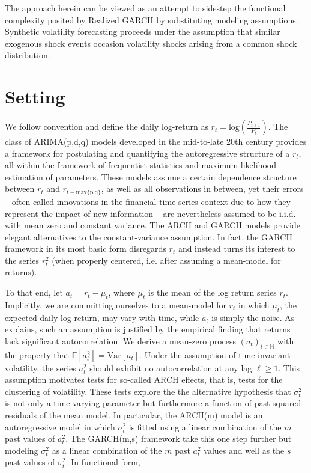 \documentclass[11pt]{article}
\def\mrm#1{\mathrm{#1}} %
\def\E{\mathbb{E}} %
\theoremstyle{definition}
\begin{document}
The approach herein can be viewed as an attempt to sidestep the functional complexity posited by Realized GARCH by substituting modeling assumptions.  Synthetic volatility forecasting proceeds under the assumption that similar exogenous shock events occasion volatility shocks arising from a common shock distribution.


\section{Setting}

\label{section2}

We follow convention and define the daily log-return as $r_{t} = \text{log}(\frac{P_{t+1}}{P_{t}})$.  The class of ARIMA(p,d,q) models developed in the mid-to-late 20th century provides a framework for postulating and quantifying the autoregressive structure of a $r_{t}$, all within the framework of frequentist statistics and maximum-likelihood estimation of parameters.  These models assume a certain dependence structure between $r_{t}$ and $r_{t-\text{max\{p,q\}}}$, as well as all observations in between, yet their errors -- often called innovations in the financial time series context due to how they represent the impact of new information -- are nevertheless assumed to be i.i.d. with mean zero and constant variance.  The ARCH \citep{engle1982autoregressive} and GARCH \citep{bollerslev1986generalized} models provide elegant alternatives to the constant-variance assumption.  In fact, the GARCH framework in its most basic form disregards $r_{t}$ and instead turns its interest to the series $r_{t}^{2}$ (when properly centered, i.e. after assuming a mean-model for returns).  

To that end, let $a_{t} = r_{t} - \mu_{t}$, where $\mu_{t}$ is the mean of the log return series $r_{t}$.  Implicitly, we are committing ourselves to a mean-model for $r_{t}$ in which $\mu_{t}$, the expected daily log-return, may vary with time, while $a_{t}$ is simply the noise.  As \citet{cont2001empirical} explains, such an assumption is justified by the empirical finding that returns lack significant autocorrelation.  We derive a mean-zero process $(a_{t})_{t\in\mathbb{N}}$ with the property that $\E[a^{2}_{t}] = \mrm{Var}[a_{t}]$.  Under the assumption of time-invariant volatility, the series $a_{t}^{2}$ should exhibit no autocorrelation at any lag $\ell\geq1$.  This assumption motivates tests for so-called ARCH effects, that is, tests for the clustering of volatility.  These tests explore the the alternative hypothesis that $\sigma_{t}^{2}$ is not only a time-varying parameter but furthermore a function of past squared residuals of the mean model.  In particular, the ARCH(m) model is an autoregressive model in which $\sigma_{t}^{2}$ is fitted using a linear combination of the $m$ past values of $a_{t}^{2}$.  The GARCH(m,s) framework take this one step further but modeling $\sigma_{t}^{2}$ as a linear combination of the $m$ past $a_{t}^{2}$ values and well as the $s$ past values of $\sigma_{t}^{2}$.  In functional form,
\end{document}
